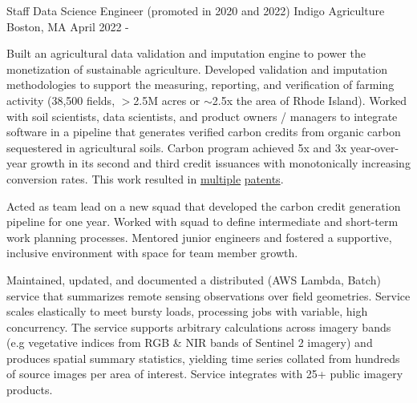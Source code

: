 

\begin{cventries}

  \cventry
    {Staff Data Science Engineer (promoted in 2020 and 2022)} %
    {Indigo Agriculture} %
    {Boston, MA} %
    {April 2022 -} %
    {
      \begin{cvitems} %
        \item {
            Built an agricultural data validation and imputation engine 
            to power the monetization of sustainable agriculture. 
            Developed validation and imputation methodologies to 
            support the measuring, reporting, and verification of 
            farming activity (38,500 fields, $>$2.5M acres or $\sim$2.5x the 
            area of Rhode Island). Worked with soil 
            scientists, data scientists, and product owners / managers 
            to integrate software in a pipeline that generates 
            verified carbon credits from organic carbon sequestered in 
            agricultural soils. Carbon program achieved 
            5x and 3x year-over-year growth in its second 
            and third credit issuances with monotonically increasing conversion 
            rates. This work resulted in 
            \href{https://patents.google.com/patent/US20230186408A1}{multiple} 
            \href{https://patents.google.com/patent/US20230078852A1}{patents}.
        }
        \item {
            Acted as team lead on a new squad that developed the carbon credit generation pipeline
            for one year. Worked with squad to define intermediate and short-term work planning processes.
            Mentored junior engineers and fostered a supportive, inclusive environment with space for
            team member growth.
        }
        \item {
            Maintained, updated, and documented a distributed (AWS Lambda, Batch) service 
            that summarizes remote sensing observations over field geometries. Service scales elastically
            to meet bursty loads, processing jobs with variable, high concurrency. The service supports
            arbitrary calculations across imagery bands (e.g vegetative indices from RGB & NIR bands of Sentinel 2 imagery)
            and produces spatial summary statistics, yielding time series collated from hundreds of source images
            per area of interest. Service integrates with 25+ public imagery products.
        }
      \end{cvitems}
    }


\end{cventries}
